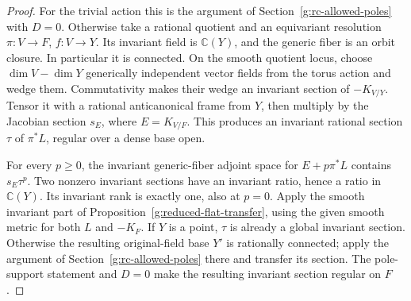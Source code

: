 \begin{proof}
For the trivial action this is the argument of Section~\ref{g:rc-allowed-poles} with
\(D=0\).  Otherwise take a rational quotient and an equivariant
resolution \(\pi:V\to F\), \(f:V\to Y\).  Its invariant field is
\(\mathbb C(Y)\), and the generic fiber is an orbit closure.  In
particular it is connected.  On the smooth quotient locus, choose
\(\dim V-\dim Y\) generically independent vector fields from the torus
action and wedge them.  Commutativity makes their wedge an invariant
section of \(-K_{V/Y}\).  Tensor it with a rational anticanonical frame
from \(Y\), then multiply by the Jacobian section \(s_E\), where
\(E=K_{V/F}\).  This produces an invariant rational section
\(\tau\) of \(\pi^*L\), regular over a dense base open.

For every \(p\ge0\), the invariant generic-fiber adjoint space for
\(E+p\pi^*L\) contains \(s_E\tau^p\).  Two nonzero invariant sections
have an invariant ratio, hence a ratio in \(\mathbb C(Y)\).
Its invariant rank is exactly one, also at \(p=0\).
Apply the smooth invariant part of
Proposition~\ref{g:reduced-flat-transfer}, using the given smooth metric
for both \(L\) and \(-K_F\).  If \(Y\) is a point, \(\tau\) is already
a global invariant section.  Otherwise the resulting original-field
base \(Y'\) is rationally connected; apply
the argument of Section~\ref{g:rc-allowed-poles} there and transfer its section.
The pole-support statement and \(D=0\) make the resulting invariant
section regular on \(F\).
\end{proof}
